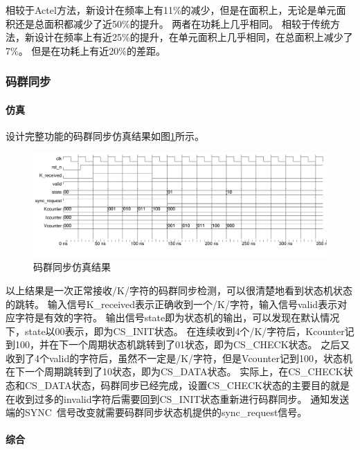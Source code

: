 \documentclass[UTF8]{ctexart}
\begin{document}
相较于Actel方法，新设计在频率上有11\%的减少，但是在面积上，无论是单元面积还是总面积都减少了近50\%的提升。
两者在功耗上几乎相同。
相较于传统方法，新设计在频率上有近25\%的提升，在单元面积上几乎相同，在总面积上减少了7\%。
但是在功耗上有近20\%的差距。

\subsubsection{码群同步}

\paragraph{仿真}

设计完整功能的码群同步仿真结果如图\ref{fig:cgs_detection_wave}所示。

\begin{figure}[H]
	\centering
	\includegraphics[width=18cm]{./img/cgs_detection_wave.pdf}
	\caption{码群同步仿真结果}
	\label{fig:cgs_detection_wave}
\end{figure}

以上结果是一次正常接收/K/字符的码群同步检测，可以很清楚地看到状态机状态的跳转。
输入信号K\_received表示正确收到一个/K/字符，输入信号valid表示对应字符是有效的字符。
输出信号state即为状态机的输出，可以发现在默认情况下，state以00表示，即为CS\_INIT状态。
在连续收到4个/K/字符后，Kcounter记到100，并在下一个周期状态机跳转到了01状态，即为CS\_CHECK状态。
之后又收到了4个valid的字符后，虽然不一定是/K/字符，但是Vcounter记到100，状态机在下一个周期跳转到了10状态，即为CS\_DATA状态。
实际上，在CS\_CHECK状态和CS\_DATA状态，码群同步已经完成，设置CS\_CHECK状态的主要目的就是在收到过多的invalid字符后需要回到CS\_INIT状态重新进行码群同步。
通知发送端的SYNC~信号改变就需要码群同步状态机提供的sync\_request信号。

\paragraph{综合}
\end{document}
